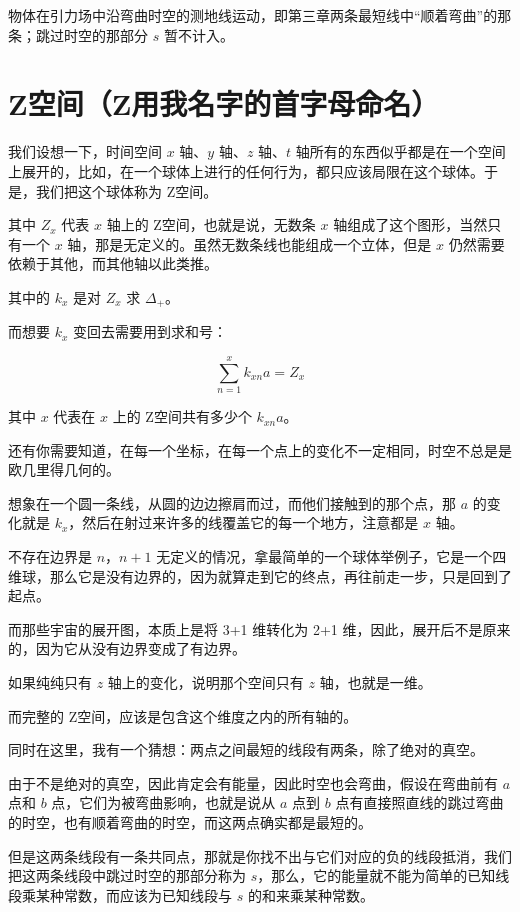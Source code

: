 \documentclass[UTF8]{ctexart}
\begin{document}
物体在引力场中沿弯曲时空的测地线运动，即第三章两条最短线中“顺着弯曲”的那条；跳过时空的那部分 \(s\) 暂不计入。

\section{Z空间（Z用我名字的首字母命名）}

我们设想一下，时间空间 \(x\) 轴、\(y\) 轴、\(z\) 轴、\(t\) 轴所有的东西似乎都是在一个空间上展开的，比如，在一个球体上进行的任何行为，都只应该局限在这个球体。于是，我们把这个球体称为 Z空间。

其中 \(Z_x\) 代表 \(x\) 轴上的 Z空间，也就是说，无数条 \(x\) 轴组成了这个图形，当然只有一个 \(x\) 轴，那是无定义的。虽然无数条线也能组成一个立体，但是 \(x\) 仍然需要依赖于其他，而其他轴以此类推。

其中的 \(k_x\) 是对 \(Z_x\) 求 \(\Delta_+\)。

而想要 \(k_x\) 变回去需要用到求和号：

\begin{equation}
\sum_{n=1}^{x}k_{xn}a=Z_x
\end{equation}

其中 \(x\) 代表在 \(x\) 上的 Z空间共有多少个 \(k_{xn}a\)。

还有你需要知道，在每一个坐标，在每一个点上的变化不一定相同，时空不总是是欧几里得几何的。

想象在一个圆一条线，从圆的边边擦肩而过，而他们接触到的那个点，那 \(a\) 的变化就是 \(k_x\)，然后在射过来许多的线覆盖它的每一个地方，注意都是 \(x\) 轴。

不存在边界是 \(n\)，\(n+1\) 无定义的情况，拿最简单的一个球体举例子，它是一个四维球，那么它是没有边界的，因为就算走到它的终点，再往前走一步，只是回到了起点。

而那些宇宙的展开图，本质上是将 3+1 维转化为 2+1 维，因此，展开后不是原来的，因为它从没有边界变成了有边界。

如果纯纯只有 \(z\) 轴上的变化，说明那个空间只有 \(z\) 轴，也就是一维。

而完整的 Z空间，应该是包含这个维度之内的所有轴的。

同时在这里，我有一个猜想：两点之间最短的线段有两条，除了绝对的真空。

由于不是绝对的真空，因此肯定会有能量，因此时空也会弯曲，假设在弯曲前有 \(a\) 点和 \(b\) 点，它们为被弯曲影响，也就是说从 \(a\) 点到 \(b\) 点有直接照直线的跳过弯曲的时空，也有顺着弯曲的时空，而这两点确实都是最短的。

但是这两条线段有一条共同点，那就是你找不出与它们对应的负的线段抵消，我们把这两条线段中跳过时空的那部分称为 \(s\)，那么，它的能量就不能为简单的已知线段乘某种常数，而应该为已知线段与 \(s\) 的和来乘某种常数。
\end{document}
